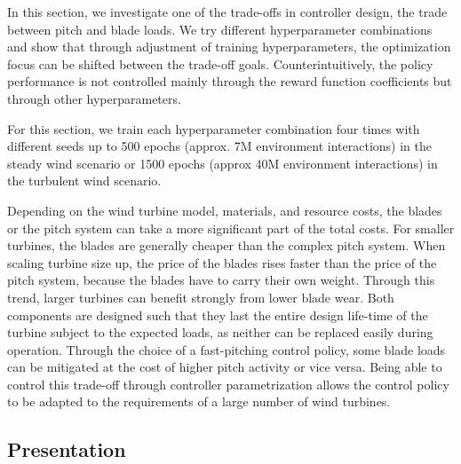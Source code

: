 \begin{summary}
In this section, we investigate one of the trade-offs in controller design, the trade between pitch and blade loads. We try different hyperparameter combinations and show that through adjustment of training hyperparameters, the optimization focus can be shifted between the trade-off goals. Counterintuitively, the policy performance is not controlled mainly through the reward function coefficients but through other hyperparameters.
\end{summary}

For this section, we train each hyperparameter combination four times with different seeds up to 500 epochs (approx. 7M environment interactions) in the steady wind scenario or 1500 epochs (approx 40M environment interactions) in the turbulent wind scenario. 

Depending on the wind turbine model, materials, and resource costs, the blades or the pitch system can take a more significant part of the total costs. For smaller turbines, the blades are generally cheaper than the complex pitch system. When scaling turbine size up, the price of the blades rises faster than the price of the pitch system, because the blades have to carry their own weight. Through this trend, larger turbines can benefit strongly from lower blade wear. \cite{stehly2019CostWind2020} Both components are designed such that they last the entire design life-time of the turbine subject to the expected loads, as neither can be replaced easily during operation. Through the choice of a fast-pitching control policy, some blade loads can be mitigated at the cost of higher pitch activity or vice versa. Being able to control this trade-off through controller parametrization allows the control policy to be adapted to the requirements of a large number of wind turbines.

\subsection{Presentation}

